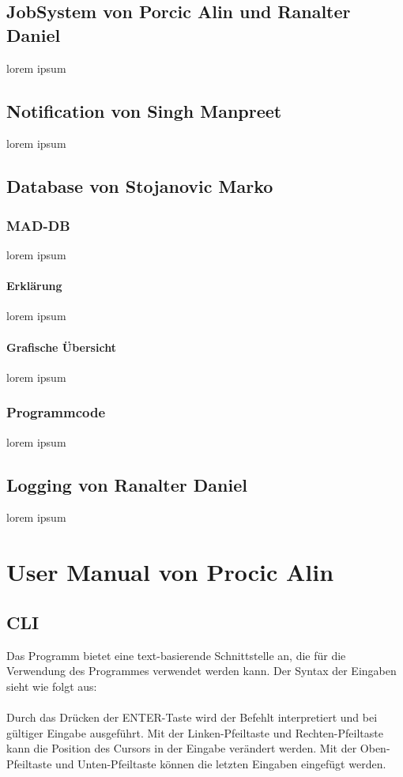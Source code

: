 \documentclass[12pt,a4paper]{report}
\begin{document}
\section{JobSystem von Porcic Alin und Ranalter Daniel}
lorem ipsum

\section{Notification von Singh Manpreet}
lorem ipsum

\section{Database von Stojanovic Marko}
\subsection{MAD-DB}
lorem ipsum
\subsubsection{Erklärung}
lorem ipsum
\subsubsection{Grafische Übersicht}
lorem ipsum
\subsection{Programmcode}
lorem ipsum

\section{Logging von Ranalter Daniel}
lorem ipsum


\chapter{User Manual von Procic Alin}

\section{CLI}

Das Programm bietet eine text-basierende Schnittstelle an, die für die Verwendung des Programmes verwendet werden kann. Der Syntax der Eingaben sieht wie folgt aus:\\\\
Durch das Drücken der ENTER-Taste wird der Befehlt interpretiert und bei gültiger Eingabe ausgeführt. Mit der Linken-Pfeiltaste und Rechten-Pfeiltaste kann die Position des Cursors in der Eingabe verändert werden. Mit der Oben-Pfeiltaste und Unten-Pfeiltaste können die letzten Eingaben eingefügt werden.
\end{document}
